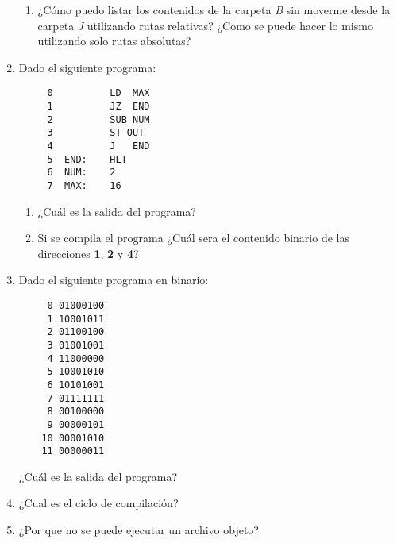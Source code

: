 \documentclass[12pt]{article}
\begin{document}
\begin{enumerate}
\begin{enumerate}
            \item ¿Cómo puedo listar los contenidos de la carpeta \emph{B}
                sin moverme desde la carpeta \emph{J} utilizando rutas
                relativas? ¿Como se puede hacer lo mismo utilizando solo rutas
                absolutas?

        \end{enumerate}

    \item Dado el siguiente programa:

        \begin{verbatim}
     0          LD  MAX
     1          JZ  END
     2          SUB NUM
     3          ST OUT
     4          J   END
     5  END:    HLT
     6  NUM:    2
     7  MAX:    16
        \end{verbatim}

        \begin{enumerate}

            \item ¿Cuál es la salida del programa?

            \item Si se compila el programa ¿Cuál sera el contenido binario de
                las direcciones \textbf{1}, \textbf{2} y \textbf{4}?

        \end{enumerate}

    \item Dado el siguiente programa en binario:

        \begin{verbatim}
     0 01000100
     1 10001011
     2 01100100
     3 01001001
     4 11000000
     5 10001010
     6 10101001
     7 01111111
     8 00100000
     9 00000101
    10 00001010
    11 00000011
        \end{verbatim}

        ¿Cuál es la salida del programa?

    \item ¿Cual es el ciclo de compilación?

    \item ¿Por que no se puede ejecutar un archivo objeto?

\end{enumerate}
\end{document}
